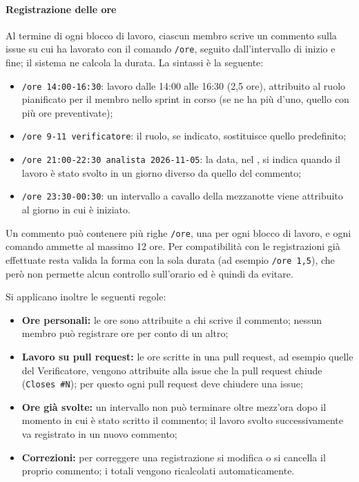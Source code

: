 \documentclass[documento]{gpt}
\begin{document}
	\paragraph{Registrazione delle ore}
	Al termine di ogni blocco di lavoro, ciascun membro scrive un commento sulla issue su cui ha lavorato con il comando \texttt{/ore}, seguito dall'intervallo di inizio e fine; il sistema ne calcola la durata. La sintassi è la seguente:
	\begin{itemize}
		\item \texttt{/ore 14:00-16:30}: lavoro dalle 14:00 alle 16:30 (2,5 ore), attribuito al ruolo pianificato per il membro nello sprint in corso (se ne ha più d'uno, quello con più ore preventivate);
		\item \texttt{/ore 9-11 verificatore}: il ruolo, se indicato, sostituisce quello predefinito;
		\item \texttt{/ore 21:00-22:30 analista 2026-11-05}: la data, nel , si indica quando il lavoro è stato svolto in un giorno diverso da quello del commento;
		\item \texttt{/ore 23:30-00:30}: un intervallo a cavallo della mezzanotte viene attribuito al giorno in cui è iniziato.
	\end{itemize}
	Un commento può contenere più righe \texttt{/ore}, una per ogni blocco di lavoro, e ogni comando ammette al massimo 12 ore. Per compatibilità con le registrazioni già effettuate resta valida la forma con la sola durata (ad esempio \texttt{/ore 1,5}), che però non permette alcun controllo sull'orario ed è quindi da evitare.
	
	Si applicano inoltre le seguenti regole:
	\begin{itemize}
		\item \textbf{Ore personali:} le ore sono attribuite a chi scrive il commento; nessun membro può registrare ore per conto di un altro;
		\item \textbf{Lavoro su pull request:} le ore scritte in una pull request, ad esempio quelle del Verificatore, vengono attribuite alla issue che la pull request chiude (\texttt{Closes \#N}); per questo ogni pull request deve chiudere una issue;
		\item \textbf{Ore già svolte:} un intervallo non può terminare oltre mezz'ora dopo il momento in cui è stato scritto il commento; il lavoro svolto successivamente va registrato in un nuovo commento;
		\item \textbf{Correzioni:} per correggere una registrazione si modifica o si cancella il proprio commento; i totali vengono ricalcolati automaticamente.
	\end{itemize}
	
\end{document}
